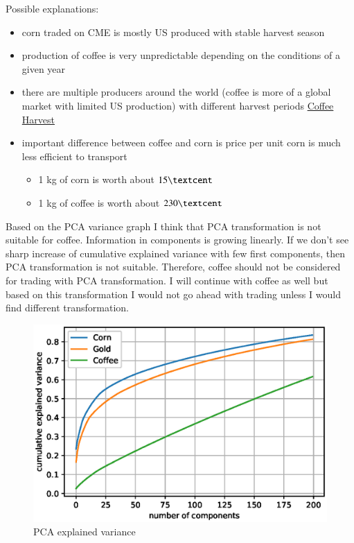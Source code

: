 \documentclass[final,2p]{elsarticle}
\begin{document}
Possible explanations:
\begin{itemize}
    \item corn traded on CME is mostly US produced with stable harvest season
    \item production of coffee is very unpredictable depending on the conditions of a given year
    \item there are multiple producers around the world (coffee is more of a global market with limited US production) with different harvest periods \href{https://driftaway.coffee/when-is-coffee-harvested/}{Coffee Harvest}
    \item important difference between coffee and corn is price per unit corn is much less efficient to transport
        \begin{itemize}
            \item 1 kg of corn is worth about $15\textcent$
            \item 1 kg of coffee is worth about $230\textcent$
        \end{itemize}
\end{itemize}
    
Based on the PCA variance graph I think that PCA transformation is not suitable for coffee. Information in components is growing linearly. If we don't see sharp increase of cumulative explained variance with few first components, then PCA transformation is not suitable. Therefore, coffee should not be considered for trading with PCA transformation. I will continue with coffee as well but based on this transformation I would not go ahead with trading unless I would find different transformation.
\begin{figure}[h]
    \centering
    \includegraphics{figures/pca.eps}
    \caption{PCA explained variance}
\end{figure}
\end{document}

